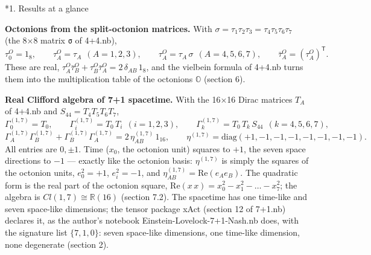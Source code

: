 \documentclass[10pt,a4paper]{article}
\makeatletter
\renewcommand\section{\@startsection{section}{1}{\z@}{-3.5ex \@plus -1ex \@minus -.2ex}{2.3ex \@plus.2ex}{\normalfont\Large\bfseries\raggedright}}
\makeatother
\begin{document}
\tableofcontents
{}\section*{1. Results at a glance}
\textbf{Octonions from the split-octonion matrices.} With $\sigma=\tau_1\tau_2\tau_3=\tau_4\tau_5\tau_6\tau_7$ (the 8×8 matrix \texttt{σ} of 4+4.nb),
\begin{equation*}
\tau^{O}_0=1_8,\qquad \tau^{O}_A=\tau_A\ \ (A=1,2,3),\qquad \tau^{O}_A=\tau_A\,\sigma\ \ (A=4,5,6,7),\qquad \bar\tau^{O}_A=(\tau^{O}_A)^{\mathsf T}.
\end{equation*}
These are real, $\tau^{O}_A\bar\tau^{O}_B+\tau^{O}_B\bar\tau^{O}_A=2\,\delta_{AB}\,1_8$, and the vielbein formula of 4+4.nb turns them into the multiplication table of the octonions $\mathbb{O}$ (section 6).

\textbf{Real Clifford algebra of 7+1 spacetime.} With the 16×16 Dirac matrices $T_A$ of 4+4.nb and $S_{44}=T_4T_5T_6T_7$,
\begin{equation*}
\Gamma^{(1,7)}_0=T_0,\qquad \Gamma^{(1,7)}_i=T_0\,T_i\ \ (i=1,2,3),\qquad \Gamma^{(1,7)}_k=T_0\,T_k\,S_{44}\ \ (k=4,5,6,7),
\end{equation*}
\begin{equation*}
\Gamma^{(1,7)}_A\Gamma^{(1,7)}_B+\Gamma^{(1,7)}_B\Gamma^{(1,7)}_A=2\,\eta^{(1,7)}_{AB}\,1_{16},\qquad \eta^{(1,7)}=\mathrm{diag}(+1,-1,-1,-1,-1,-1,-1,-1).
\end{equation*}
All entries are $0,\pm1$. Time ($x_0$, the octonion unit) squares to $+1$, the seven space directions to $-1$ — exactly like the octonion basis: $\eta^{(1,7)}$ is simply the squares of the octonion units, $e_0^2=+1$, $e_i^2=-1$, and $\eta^{(1,7)}_{AB}=\mathrm{Re}(e_Ae_B)$. The quadratic form is the real part of the octonion square, $\mathrm{Re}(x\,x)=x_0^2-x_1^2-\dots-x_7^2$; the algebra is $Cl(1,7)\cong\mathbb{R}(16)$ (section 7.2). The spacetime has one time-like and seven space-like dimensions; the tensor package xAct (section 12 of 7+1.nb) declares it, as the author’s notebook Einstein-Lovelock-7+1-Nash.nb does, with the signature list $\{7,1,0\}$: seven space-like dimensions, one time-like dimension, none degenerate (section 2).
\end{document}
